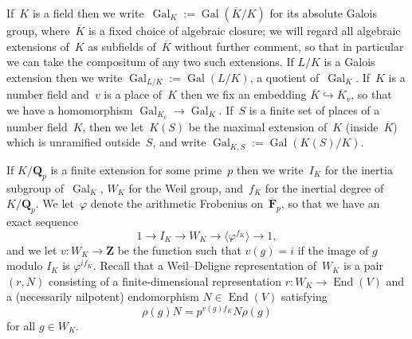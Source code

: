 \documentclass{amsart}
\renewcommand{\mathbb}{\mathbf}
\newcommand{\Kbar}{\overline{K}}
\theoremstyle{definition}
\theoremstyle{remark}
\newcommand{\mar}[1]{}
\newcommand{\mar}[1]{\marginpar{\raggedright\tiny squirrel #1}}
\newcommand{\F}{\FF}
\newcommand{\Q}{\QQ}
\newcommand{\Z}{\ZZ}
\newcommand{\FF}{{\mathbb F}}
\newcommand{\QQ}{{\mathbb Q}}
\newcommand{\ZZ}{{\mathbb Z}}
\newcommand{\Fbar}{\overline{\F}}
\newcommand{\Fpbar}{\Fbar_p}
\newcommand{\Qp}{\Q_p}
\DeclareMathOperator{\Aut}{Aut}
\DeclareMathOperator{\End}{End}
\DeclareMathOperator{\Gal}{Gal}
\newcommand{\nr}{\mathrm{nr}}
\newcommand{\into}{\hookrightarrow}
\begin{document}
If~$K$ is a field then we write~$\Gal_K:=\Gal(\overline{K}/K)$ for its
absolute Galois group, where~$\overline{K}$ is a fixed choice of
algebraic closure; we will regard all algebraic extensions of~$K$ as
subfields of~$\overline{K}$ without further comment, so that in
particular we can take the compositum of any two such extensions. If $L/K$ is a Galois extension then we write
$\Gal_{L/K}:=\Gal(L/K)$, a quotient of~$\Gal_K$.  %
If~$K$ is a number field and~$v$
is a place of~$K$ then we fix an embedding $\Kbar\into\Kbar_v$, so
that we have a homomorphism $\Gal_{K_v}\to\Gal_K$. If~$S$ is a finite
set of places of a number field~$K$, then we let~$K(S)$ be the maximal
extension of~$K$ (inside~$\Kbar$) which is unramified outside~$S$, and
write $\Gal_{K,S}:=\Gal(K(S)/K)$.


 If
$K/\Qp$ is a finite extension for some prime~$p$ then we write~$I_K$
for the inertia subgroup of~$\Gal_K$, $W_K$ for the Weil
group, and~$f_K$ for the inertial degree of~$K/\Qp$. We let~$\varphi$
denote the arithmetic Frobenius on~$\Fpbar$, so that we have an exact sequence
\[	1\rightarrow I_{K}\rightarrow W_K\rightarrow \langle \varphi^{f_K}\rangle \rightarrow 1,	\]
and we let $v:W_K\rightarrow \Z$ be
the function such that $v(g)=i$ if the image of $g$ modulo $I_{K}$ is
$\varphi^{if_K}$.
 Recall that a Weil--Deligne representation of~$W_K$ is a
pair $(r,N)$  consisting of a finite-dimensional
representation $r:W_K\to\End(V)$ and a (necessarily nilpotent)
endomorphism $N\in\End(V)$
satisfying \[\rho(g)N=p^{v(g)f_K}N\rho(g) \] for all $g\in
W_K$. %
\end{document}
